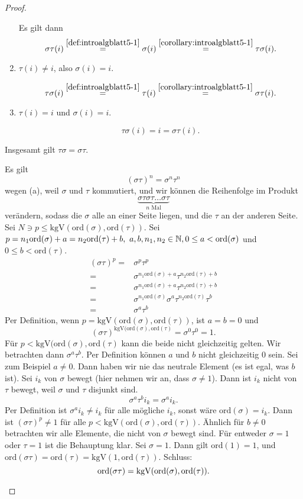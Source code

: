 \begin{proof}
\begin{parts}
\begin{enumerate}[label=(\roman*)]
				Es gilt dann
				\[
					\sigma\tau(i)\overset{\ref{def:introalgblatt5-1}}{=}\sigma(i)\overset{\ref{corollary:introalgblatt5-1}}{=}\tau\sigma(i)
				.\] 
			\item $\tau(i)\neq i$, also $\sigma(i)=i$.

				\[
					\tau\sigma(i)\overset{\ref{def:introalgblatt5-1}}{=}\tau(i)\overset{\ref{corollary:introalgblatt5-1}}{=}\sigma\tau(i)
				.\] 
			\item $\tau(i)=i$ und $\sigma(i)=i$.

				\[
				\tau\sigma(i)=i=\sigma\tau(i)
				.\] 
		\end{enumerate}
		Insgesamt gilt $\tau\sigma=\sigma\tau$.
	\item Es gilt
		\[
			(\sigma\tau)^n=\sigma^n\tau^n
		\]
		wegen (a), weil $\sigma$ und $\tau$ kommutiert, und wir können die Reihenfolge im Produkt
		\[
			\underbrace{\sigma\tau\sigma\tau\dots\sigma\tau}_{n\text{ Mal}}
		\]
		verändern, sodass die $\sigma$ alle an einer Seite liegen, und die $\tau$ an der anderen Seite. Sei $N\ni p\le\text{kgV}(\text{ord}(\sigma),\text{ord}(\tau))$. Sei $p=n_1\text{ord}(\sigma)+a=n_2\text{ord}(\tau)+b,~a,b,n_1,n_2\in \mathbb{N}, 0\le a < \text{ord}(\sigma)$ und $0\le b <\text{ord}(\tau)$.
		\begin{align*}
		(\sigma\tau)^p =& \sigma^p\tau^p\\
		=& \sigma^{n_1\text{ord}(\sigma)+a}\tau^{n_2\text{ord}(\tau)+b}\\
				=&\sigma^{n_1\text{ord}(\sigma)+a}\tau^{n_2\text{ord}(\tau)+b}\\
				=&\sigma^{n_1\text{ord}(\sigma)}\sigma^a\tau^{n_2\text{ord}(\tau)}\tau^b\\
					=&\sigma^a\tau^b
		\end{align*}
		Per Definition, wenn $p=\text{kgV}(\text{ord}(\sigma),\text{ord}(\tau))$, ist $a=b=0$ und
		\[
			(\sigma\tau)^{\text{kgV}(\text{ord}(\sigma),\text{ord}(\tau)}=\sigma^0\tau^0=1
		.\] 
		F\"{u}r $p<\text{kgV}(\text{ord}(\sigma),\text{ord}(\tau)$ kann die beide nicht gleichzeitig gelten. Wir betrachten dann $\sigma^a\tau^b$. Per Definition können $a$ und $b$ nicht gleichzeitig $0$ sein. Sei zum Beispiel $a\neq 0$. Dann haben wir nie das neutrale Element (es ist egal, was $b$ ist). Sei $i_k$ von $\sigma$ bewegt (hier nehmen wir an, dass $\sigma\neq 1$). Dann ist $i_k$ nicht von $\tau$ bewegt, weil $\sigma$ und $\tau$ disjunkt sind.
		\[
		\sigma^a\tau^b i_k =\sigma^a i_k
		.\] 
		Per Definition ist $\sigma^a i_k\neq i_k$ f\"{u}r alle mögliche $i_k$, sonst wäre $\text{ord}(\sigma)=i_k$. Dann ist $(\sigma\tau)^p\neq 1$ f\"{u}r alle $p<\text{kgV}(\text{ord}(\sigma),\text{ord}(\tau))$. Ähnlich für $b\neq 0$ betrachten wir alle Elemente, die nicht von $\sigma$ bewegt sind. F\"{u}r entweder $\sigma=1$ oder $\tau=1$ ist die Behauptung klar. Sei $\sigma=1$. Dann gilt $\text{ord}(1)=1$, und $\text{ord}(\sigma\tau)=\text{ord}(\tau)=\text{kgV}(1,\text{ord}(\tau))$. Schluss:
	 \[
		 \text{ord}(\sigma\tau)=\text{kgV}(\text{ord}(\sigma),\text{ord}(\tau))
	.\qedhere\] 
	\end{parts}
\end{proof}
